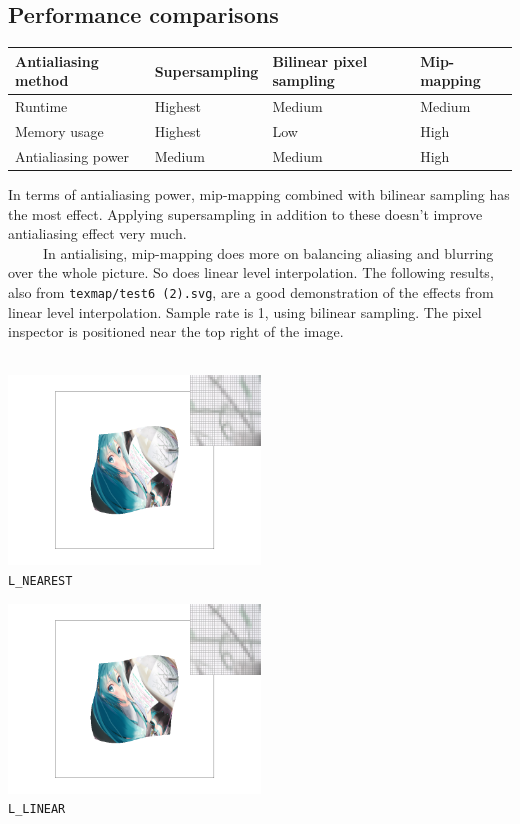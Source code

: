 \documentclass[11pt]{article}
\begin{document}
\subsection{Performance comparisons}
\begin{table}[htbp]
    \centering
    \begin{tabular}{l|lll}
        \hline
        Antialiasing method  & Supersampling & Bilinear pixel sampling & Mip-mapping \\
        \hline
        Runtime  & Highest   & Medium & Medium \\
        Memory usage& Highest  & Low & High \\
        Antialiasing power& Medium  & Medium & High \\
        \hline
    \end{tabular}
\end{table}
In terms of antialiasing power, mip-mapping combined with bilinear sampling has the most effect. Applying supersampling in addition to these doesn't improve antialiasing effect very much.\\
\mbox{\ \ \ \ \ }In antialising, mip-mapping does more on balancing aliasing and blurring over the whole picture. So does linear level interpolation. The following results, also from \verb|texmap/test6 (2).svg|, are a good demonstration of the effects from linear level interpolation. Sample rate is 1, using bilinear sampling. The pixel inspector is positioned near the top right of the image.\\\vspace{3pt}\\
{
    \centering
    \begin{minipage}[htbp]{190pt}
        \centering\includegraphics[width=190pt]{screenshot_2-17_23-25-22.png}\\\verb|L_NEAREST|
    \end{minipage}
    \begin{minipage}[htbp]{190pt}
        \centering\includegraphics[width=190pt]{screenshot_2-17_23-25-28.png}\\\verb|L_LINEAR|
    \end{minipage}
}\\\vspace{1pt}\\
\end{document}
